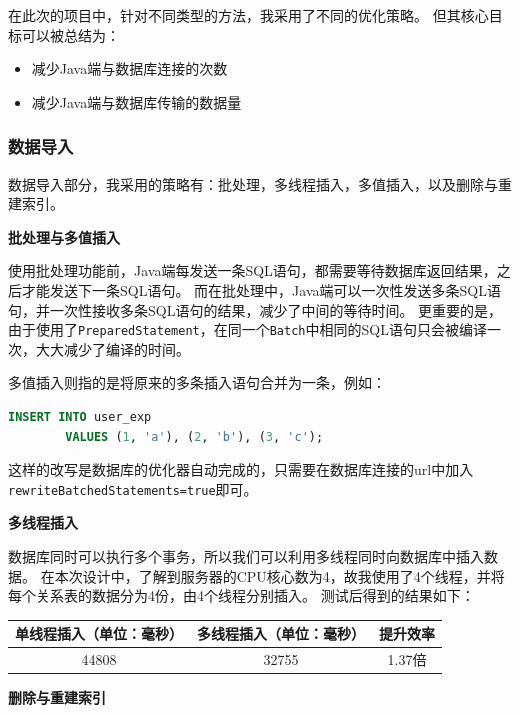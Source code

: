 \documentclass[a4paper,10pt]{ctexart}
\begin{document}
在此次的项目中，针对不同类型的方法，我采用了不同的优化策略。
但其核心目标可以被总结为：
\begin{itemize}
    \item 减少Java端与数据库连接的次数
    \item 减少Java端与数据库传输的数据量
\end{itemize}

\subsubsection{数据导入}

数据导入部分，我采用的策略有：批处理，多线程插入，多值插入，以及删除与重建索引。

\textbf{批处理与多值插入}

使用批处理功能前，Java端每发送一条SQL语句，都需要等待数据库返回结果，之后才能发送下一条SQL语句。
而在批处理中，Java端可以一次性发送多条SQL语句，并一次性接收多条SQL语句的结果，减少了中间的等待时间。
更重要的是，由于使用了\texttt{PreparedStatement}，在同一个\texttt{Batch}中相同的SQL语句只会被编译一次，大大减少了编译的时间。

多值插入则指的是将原来的多条插入语句合并为一条，例如：
\begin{center}
    \begin{lstlisting}[language=SQL]
        INSERT INTO user_exp
        VALUES (1, 'a'), (2, 'b'), (3, 'c');
    \end{lstlisting}
\end{center}

这样的改写是数据库的优化器自动完成的，只需要在数据库连接的url中加入\texttt{rewriteBatchedStatements=true}即可。

\textbf{多线程插入}

数据库同时可以执行多个事务，所以我们可以利用多线程同时向数据库中插入数据。
在本次设计中，了解到服务器的CPU核心数为4，故我使用了4个线程，并将每个关系表的数据分为4份，由4个线程分别插入。
测试后得到的结果如下：
\begin{center}
    \begin{tabular}{ccc}
        \toprule
        \textbf{单线程插入（单位：毫秒）} & \textbf{多线程插入（单位：毫秒）} & \textbf{提升效率} \\
        \midrule
        44808 & 32755 & 1.37倍 \\
        \bottomrule
    \end{tabular}
\end{center}

\textbf{删除与重建索引}
\end{document}
